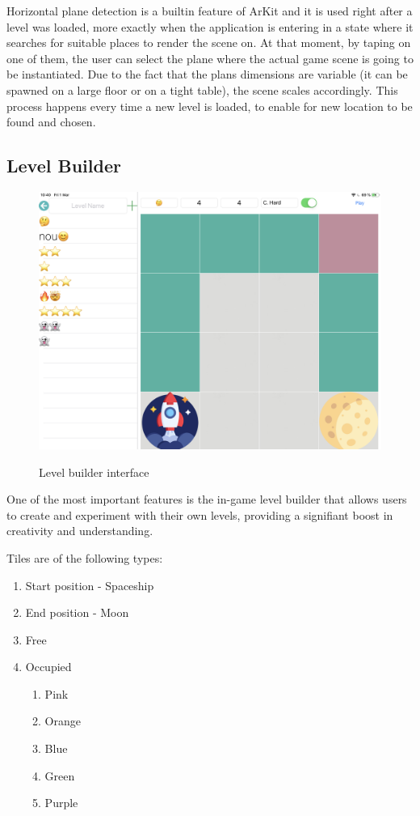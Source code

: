 \documentclass[12 pct]{report}
\begin{document}
Horizontal plane detection is a builtin feature of ArKit and it is used right after a level was loaded, more exactly when the application is entering in a state where it searches for suitable places to render the scene on. At that moment, by taping on one of them, the user can select the plane where the actual game scene is going to be instantiated. Due to the fact that the plans dimensions are variable (it can be spawned on a large floor or on a tight table), the scene scales accordingly. This process happens every time a new level is loaded, to enable for new location to be found and chosen.
\subsection*{Level Builder}
\begin{figure}[H]
\includegraphics[width=1.0\textwidth]{ArRobotCode3}
\centering
\label{fig:levelBuilder}
\caption{Level builder interface}
\end{figure}

One of the most important features is the in-game level builder that allows users to create and experiment with their own levels, providing a signifiant boost in creativity and understanding. 

Tiles are of the following types:
\begin{enumerate}
\item Start position - Spaceship
\item End position - Moon
\item Free
\item Occupied
\begin{enumerate}
\item Pink
\item Orange
\item Blue
\item Green
\item Purple
\end{enumerate}
\end{enumerate}
\end{document}
